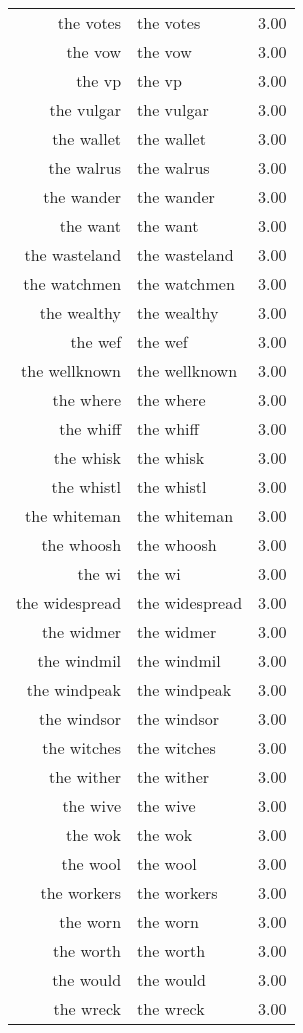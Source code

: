 \begin{table}[ht]
\begin{tabular}{rlr}
  the votes & the votes & 3.00 \\ 
  the vow & the vow & 3.00 \\ 
  the vp & the vp & 3.00 \\ 
  the vulgar & the vulgar & 3.00 \\ 
  the wallet & the wallet & 3.00 \\ 
  the walrus & the walrus & 3.00 \\ 
  the wander & the wander & 3.00 \\ 
  the want & the want & 3.00 \\ 
  the wasteland & the wasteland & 3.00 \\ 
  the watchmen & the watchmen & 3.00 \\ 
  the wealthy & the wealthy & 3.00 \\ 
  the wef & the wef & 3.00 \\ 
  the wellknown & the wellknown & 3.00 \\ 
  the where & the where & 3.00 \\ 
  the whiff & the whiff & 3.00 \\ 
  the whisk & the whisk & 3.00 \\ 
  the whistl & the whistl & 3.00 \\ 
  the whiteman & the whiteman & 3.00 \\ 
  the whoosh & the whoosh & 3.00 \\ 
  the wi & the wi & 3.00 \\ 
  the widespread & the widespread & 3.00 \\ 
  the widmer & the widmer & 3.00 \\ 
  the windmil & the windmil & 3.00 \\ 
  the windpeak & the windpeak & 3.00 \\ 
  the windsor & the windsor & 3.00 \\ 
  the witches & the witches & 3.00 \\ 
  the wither & the wither & 3.00 \\ 
  the wive & the wive & 3.00 \\ 
  the wok & the wok & 3.00 \\ 
  the wool & the wool & 3.00 \\ 
  the workers & the workers & 3.00 \\ 
  the worn & the worn & 3.00 \\ 
  the worth & the worth & 3.00 \\ 
  the would & the would & 3.00 \\ 
  the wreck & the wreck & 3.00 \\ 

\end{tabular}
\end{table}
